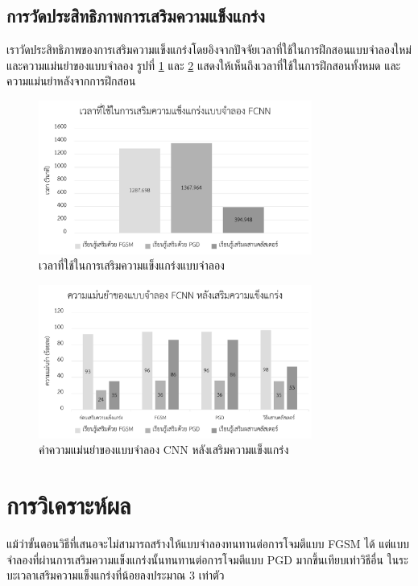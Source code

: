 \subsection{การวัดประสิทธิภาพการเสริมความแข็งแกร่ง}

เราวัดประสิทธิภาพของการเสริมความแข็งแกร่งโดยอิงจากปัจจัยเวลาที่ใช้ในการฝึกสอนแบบจำลองใหม่ และความแม่นยำของแบบจำลอง รูปที่ \ref{time-used} และ \ref{acc-after} แสดงให้เห็นถึงเวลาที่ใช้ในการฝึกสอนทั้งหมด และความแม่นยำหลังจากการฝึกสอน

\begin{figure}
    \centering
    \includegraphics[width=0.8\textwidth]{images/time.pdf}
    \caption{เวลาที่ใช้ในการเสริมความแข็งแกร่งแบบจำลอง}
    \label{time-used}
\end{figure}

\begin{figure}
    \centering
    \includegraphics[width=0.8\textwidth]{images/fcnn-acc-after.pdf}
    \caption{ค่าความแม่นยำของแบบจำลอง CNN หลังเสริมความแข็งแกร่ง}
    \label{acc-after}
\end{figure}

\section{การวิเคราะห์ผล}

แม้ว่าขั้นตอนวิธีที่เสนอจะไม่สามารถสร้างให้แบบจำลองทนทานต่อการโจมตีแบบ FGSM ได้ แต่แบบจำลองที่ผ่านการเสริมความแข็งแกร่งนั้นทนทานต่อการโจมตีแบบ PGD มากขึ้นเทียบเท่าวิธีอื่น ในระบะเวลาเสริมความแข็งแกร่งที่น้อยลงประมาณ 3 เท่าตัว